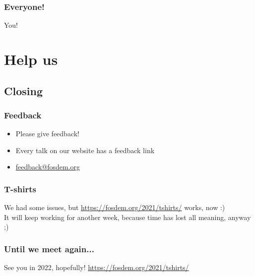 \documentclass[aspectratio=169]{beamer}
\begin{document}
\begin{frame}
	\frametitle{Everyone!}
	\vfill
	\begin{center}
	{\Huge You!}
	\end{center}
	\vfill
\end{frame}


\section{Help us}

\subsection{Closing}

\begin{frame}
	\frametitle{Feedback}
	\vfill
	\begin{itemize}
		\item Please give feedback!
		\item Every talk on our website has a feedback link
		\item \url{feedback@fosdem.org}
	\end{itemize}
	\vfill
\end{frame}

\begin{frame}
	\frametitle{T-shirts}
	\begin{center}
	\vfill
		We had some issues, but \url{https://fosdem.org/2021/tshirts/} works, now :) \\
	\vfill
		It will keep working for another week, because time has lost all meaning, anyway ;)
	\vfill
	\end{center}
\end{frame}

\begin{frame}
	\frametitle{Until we meet again...}
	\begin{center}
	\vfill
		{\Huge See you in 2022, hopefully!}
	\vfill
		\url{https://fosdem.org/2021/tshirts/}
	\vfill
	\end{center}
\end{frame}
\end{document}
